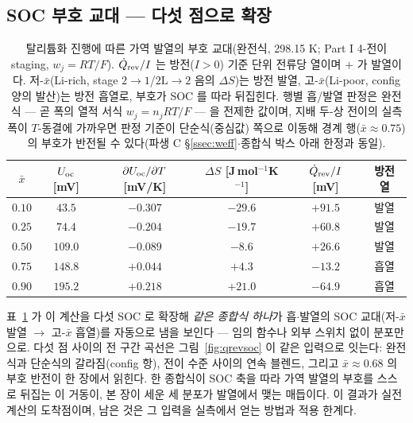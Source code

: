 \subsection{SOC 부호 교대 --- 다섯 점으로 확장}\label{ssec:qrevtab}
\begin{table}[t]
\centering\small
\renewcommand{\arraystretch}{1.25}
\caption{탈리튬화 진행에 따른 가역 발열의 부호 교대(완전식, 298.15 K; Part I 4-전이 staging, $w_j{=}RT/F$).
$\dot Q_{\mathrm{rev}}/I$ 는 방전($I>0$) 기준 단위 전류당 열이며 $+$ 가 발열이다. 저-$\bar x$(Li-rich, stage
$2\!\to\!1$/$2\mathrm L\!\to\!2$ 음의 $\Delta S$)는 방전 발열, 고-$\bar x$(Li-poor, config 양의 발산)는 방전
흡열로, 부호가 SOC 를 따라 뒤집힌다. 행별 흡/발열 판정은 완전식 --- 곧 폭의 열적 서식
$w_j{=}n_jRT/F$ --- 을 전제한 값이며, 지배 두-상 전이의 실측 폭이 $T$-동결에 가까우면 판정 기준이
단순식(중심값) 쪽으로 이동해 경계 행($\bar x{\approx}0.75$)의 부호가 반전될 수 있다(파생 C
\S\ref{ssec:weff}$\cdot$종합식 박스 아래 한정과 동일).}
\label{tab:qrev}
\begin{tabular}{cccccc}
\toprule
$\bar x$ & $U_{\mathrm{oc}}$ [mV] & $\partial U_{\mathrm{oc}}/\partial T$ [mV/K] & $\Delta S$ [J\,mol$^{-1}$K$^{-1}$] & $\dot Q_{\mathrm{rev}}/I$ [mV] & 방전 열 \\
\midrule
$0.10$ & $43.5$  & $-0.307$ & $-29.6$ & $+91.5$ & 발열 \\
$0.25$ & $74.4$  & $-0.204$ & $-19.7$ & $+60.8$ & 발열 \\
$0.50$ & $109.0$ & $-0.089$ & $-8.6$  & $+26.6$ & 발열 \\
$0.75$ & $148.8$ & $+0.044$ & $+4.3$  & $-13.2$ & 흡열 \\
$0.90$ & $195.2$ & $+0.218$ & $+21.0$ & $-64.9$ & 흡열 \\
\bottomrule
\end{tabular}
\end{table}

표~\ref{tab:qrev} 가 이 계산을 다섯 SOC 로 확장해 \emph{같은 종합식 하나}가 흡$\cdot$발열의 SOC 교대(저-$\bar x$
발열 $\to$ 고-$\bar x$ 흡열)를 자동으로 냄을 보인다 --- 임의 함수나 외부 스위치 없이 분포만으로. 다섯 점
사이의 전 구간 곡선은 그림~\ref{fig:qrevsoc} 이 같은 입력으로 잇는다: 완전식과 단순식의 갈라짐(config 항),
전이 수준 사이의 연속 블렌드, 그리고 $\bar x\approx0.68$ 의 부호 반전이 한 장에서 읽힌다. 한 종합식이
SOC 축을 따라 가역 발열의 부호를 스스로 뒤집는 이 거동이, 본 장이 세운 세 분포가 발열에서 맺는 매듭이다.
이 결과가 실전 계산의 도착점이며, 남은 것은 그 입력을 실측에서 얻는 방법과 적용 한계다.

